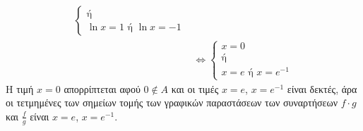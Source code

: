 \begin{alist}
\begin{align*}
\begin{cases}
        \text{ή} \\
        \ln x = 1 \text{ ή } \ln x = -1
    \end{cases} \\
    &\Leftrightarrow \begin{cases}
        x = 0 \\
        \text{ή} \\
        x = e \text{ ή } x = e^{-1}
    \end{cases}
\end{align*}
Η τιμή $x=0$ απορρίπτεται αφού $0 \notin A$ και οι τιμές $x=e$, $x=e^{-1}$ είναι δεκτές, άρα οι τετμημένες των σημείων τομής των γραφικών παραστάσεων των συναρτήσεων $f \cdot g$ και $\frac{f}{g}$ είναι $x=e$, $x=e^{-1}$.
\end{alist}